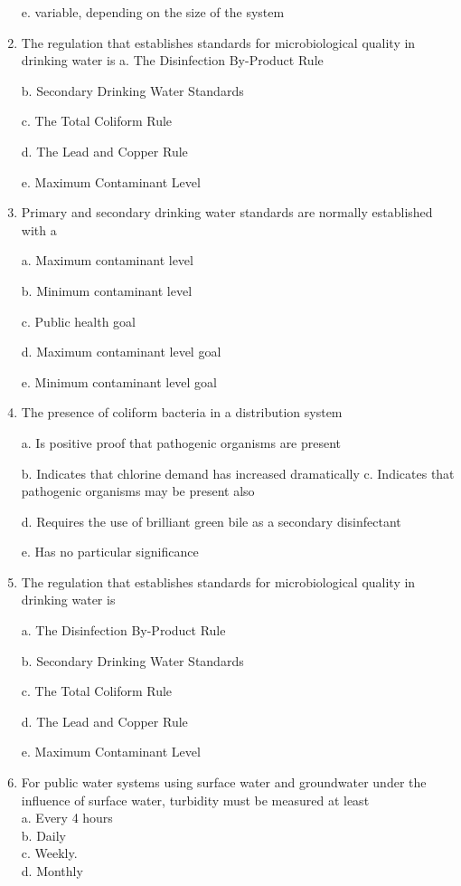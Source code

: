 \documentclass[10pt]{article}
\begin{document}
\begin{enumerate}
e. variable, depending on the size of the system

  \item The regulation that establishes standards for microbiological quality in drinking water is
a. The Disinfection By-Product Rule

b. Secondary Drinking Water Standards

c. The Total Coliform Rule

d. The Lead and Copper Rule

e. Maximum Contaminant Level


  \item Primary and secondary drinking water standards are normally established with a

a. Maximum contaminant level

b. Minimum contaminant level

c. Public health goal

d. Maximum contaminant level goal

e. Minimum contaminant level goal

\item The presence of coliform bacteria in a distribution system

a. Is positive proof that pathogenic organisms are present

b. Indicates that chlorine demand has increased dramatically 
c. Indicates that pathogenic organisms may be present also

d. Requires the use of brilliant green bile as a secondary disinfectant

e. Has no particular significance

\item The regulation that establishes standards for microbiological quality in drinking water is

a. The Disinfection By-Product Rule

b. Secondary Drinking Water Standards

c. The Total Coliform Rule

d. The Lead and Copper Rule

e. Maximum Contaminant Level

\item For public water systems using surface water and groundwater under the influence of surface water, turbidity must be measured at least\\
a. Every 4 hours\\
b. Daily\\
c. Weekly.\\
d. Monthly\\


\end{enumerate}
\end{document}
